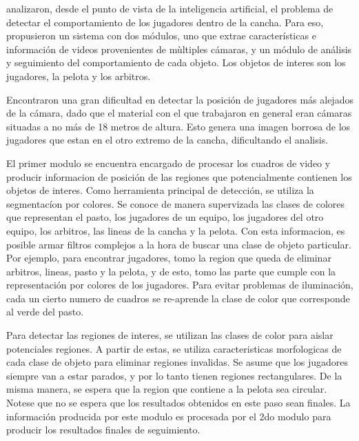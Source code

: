 \documentclass[a4paper,10pt]{article}
\begin{document}
\citeauthor*{beetz-05} analizaron, desde el punto de vista de la inteligencia
artificial, el problema de detectar el comportamiento de los jugadores dentro
de la cancha. Para eso, propusieron un sistema con dos módulos, uno que extrae
características e información de videos provenientes de mùltiples cámaras, y
un módulo de análisis y seguimiento del comportamiento de cada objeto.
Los objetos de interes son los jugadores, la pelota y los arbitros.

Encontraron una gran dificultad en detectar la posición de jugadores más alejados de la cámara,
dado que el material con el que trabajaron en general eran cámaras situadas a no más de 18
metros de altura. Esto genera una imagen borrosa de los jugadores que estan
en el otro extremo de la cancha, dificultando el analisis.

El primer modulo se encuentra encargado de procesar los cuadros de video y producir informacion
de posición de las regiones que potencialmente contienen los objetos de interes.
Como herramienta principal de detección, se utiliza la segmentacíon por colores.
Se conoce de manera supervizada las clases de colores que representan el pasto, los jugadores de un equipo,
los jugadores del otro equipo, los arbitros, las lineas de la cancha y la pelota.
Con esta informacion, es posible armar filtros complejos a la hora de buscar una clase de objeto particular.
Por ejemplo, para encontrar jugadores, tomo la region que queda de eliminar arbitros, lineas, pasto y la pelota,
y de esto, tomo las parte que cumple con la representación por colores de los jugadores.
Para evitar problemas de iluminación, cada un cierto numero de cuadros se re-aprende la clase de color
que corresponde al verde del pasto.

Para detectar las regiones de interes, se utilizan las clases de color para aislar potenciales regiones.
A partir de estas, se utiliza caracteristicas morfologicas de cada clase de objeto para eliminar regiones
invalidas. Se asume que los jugadores siempre van a estar parados, y por lo tanto tienen regiones rectangulares.
De la misma manera, se espera que la region que contiene a la pelota sea circular.
Notese que no se espera que los resultados obtenidos en este paso sean finales.
La información producida por este modulo es procesada por el 2do modulo para producir los resultados finales de
seguimiento.
\end{document}
